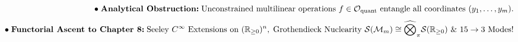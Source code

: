 \documentclass[preview]{standalone}
\begin{document}
\begin{align*}
\special{dvisvgm:raw <g id='unique000'>}\bullet\;\textbf{Analytical Obstruction:}\;\text{Unconstrained multilinear operations }f\in\mathcal{O}_{\text{quant}}\text{ entangle all coordinates }(y_1,\dots,y_m).\\[4pt]\bullet\;\textbf{Functorial Ascent to Chapter 8:}\;\text{Seeley }C^\infty\text{ Extensions on }(\mathbb{R}_{\ge 0})^n,\;\text{Grothendieck Nuclearity }\mathcal{S}(\mathcal{M}_m)\cong\widehat{\bigotimes}_\pi\mathcal{S}(\mathbb{R}_{\ge 0})\text{ \& }15\to 3\text{ Modes!}\special{dvisvgm:raw </g>}
\end{align*}
\end{document}
